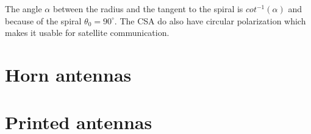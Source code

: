 The angle $\alpha$ between the radius and the tangent to the spiral is $cot^{-1}(\alpha)$ and because of the spiral $\theta_0 = 90^\circ$. The CSA do also have circular polarization which makes it usable for satellite communication. 




\section{Horn antennas}
\section{Printed antennas}










    



   